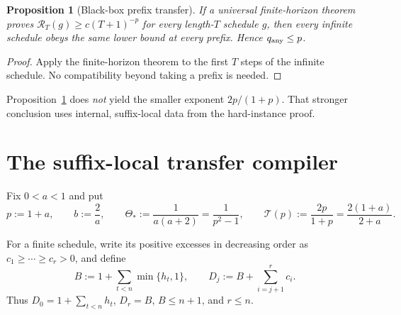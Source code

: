 \documentclass[11pt]{article}
\newtheorem{proposition}[theorem]{Proposition}
\theoremstyle{remark}
\newcommand{\Risk}{\mathcal R}
\newcommand{\Transfer}{\mathcal T}
\begin{document}
\begin{proposition}[Black-box prefix transfer]
\label{prop:black-box}
If a universal finite-horizon theorem proves
\(\Risk_T(g)\ge c(T+1)^{-p}\) for every length-\(T\) schedule \(g\), then
every infinite schedule obeys the same lower bound at every prefix.  Hence
\(q_{\rm any}\le p\).
\end{proposition}

\begin{proof}
Apply the finite-horizon theorem to the first \(T\) steps of the infinite
schedule.  No compatibility beyond taking a prefix is needed.
\end{proof}

Proposition~\ref{prop:black-box} does \emph{not} yield the smaller exponent
\(2p/(1+p)\).  That stronger conclusion uses internal, suffix-local data from
the hard-instance proof.

\section{The suffix-local transfer compiler}

Fix \(0<a<1\) and put
\begin{equation}
 p:=1+a,\qquad b:=\frac2a,\qquad
 \Theta_*:=\frac1{a(a+2)}=\frac1{p^2-1},\qquad
 \Transfer(p):=\frac{2p}{1+p}=\frac{2(1+a)}{2+a}.
 \label{eq:parameters}
\end{equation}

For a finite schedule, write its positive excesses in decreasing order as
\(c_1\ge\cdots\ge c_r>0\), and define
\begin{equation}
 B:=1+\sum_{t<n}\min\{h_t,1\},\qquad
 D_j:=B+\sum_{i=j+1}^r c_i.
 \label{eq:ranked-state}
\end{equation}
Thus \(D_0=1+\sum_{t<n}h_t\), \(D_r=B\), \(B\le n+1\), and
\(r\le n\).
\end{document}
